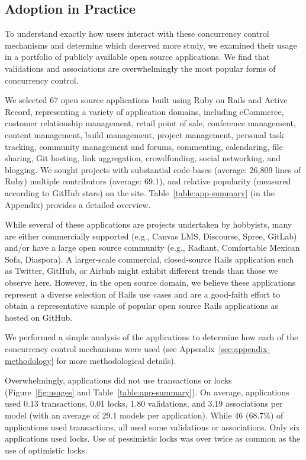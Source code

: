 \subsection{Adoption in Practice}

To understand exactly how users interact with these
concurrency control mechanisms and determine which deserved more
study, we examined their usage in a portfolio of publicly available
open source applications. We find that validations and associations
are overwhelmingly the most popular forms of concurrency control.

 We selected 67 open source applications
built using Ruby on Rails and Active Record, representing a variety of
application domains, including eCommerce, customer relationship
management, retail point of sale, conference management, content
management, build management, project management, personal task
tracking, community management and forums, commenting, calendaring,
file sharing, Git hosting, link aggregation, crowdfunding, social
networking, and blogging. We sought projects with substantial
code-bases (average: 26,809 lines of Ruby) multiple contributors
(average: 69.1), and relative popularity (measured according to GitHub
stars) on the site. Table~\ref{table:app-summary} (in the Appendix)
provides a detailed overview.


While several of these applications are projects undertaken by
hobbyists, many are either commercially supported (e.g., Canvas LMS,
Discourse, Spree, GitLab) and/or have a large open source community
(e.g., Radiant, Comfortable Mexican Sofa, Diaspora). A
larger-scale commercial, closed-source Rails application such as
Twitter, GitHub, or Airbnb might exhibit different trends than those
we observe here. However, in the open source domain, we believe these
applications represent a diverse selection of Rails use cases and are
a good-faith effort to obtain a representative sample of
popular open source Rails applications as hosted on GitHub.

 We performed a simple analysis of the
applications to determine how each of the concurrency control
mechanisms were used (see Appendix~\ref{sec:appendix-methodology} for more
methodological details).

Overwhelmingly, applications did not use transactions or locks
(Figure~\ref{fig:usages} and Table~\ref{table:app-summary}). On
average, applications used 0.13 transactions, 0.01 locks, 1.80
validations, and 3.19 associations per model (with an average of 29.1
models per application). While 46 (68.7\%) of applications used
transactions, all used some validations or associations. Only six
applications used locks. Use of pessimistic locks was over twice
as common as the use of optimistic locks.

